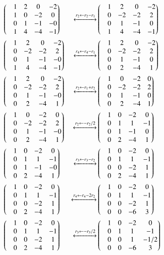 \documentclass[journal,12pt,twocolumn]{IEEEtran}
\begin{document}
\begin{align}
 & \begin{pmatrix}&1 &2 & 0 &-2 \\ &1 &0 &-2 & 0 \\ &0 &1 &-1 &-0 \\&1 &4 &-4 &-1\end{pmatrix} &\xleftrightarrow[]{r_2 \leftarrow r_2 - r_1} &\begin{pmatrix}&1 &2 &0 &-2 \\ &0 &-2 &-2 &2 \\ &0 &1 &-1 &0 \\&1 &4 &-4 &-1\end{pmatrix} \\
 & \begin{pmatrix}&1 &2 &0 &-2 \\ &0 &-2 &-2 &2 \\ &0 &1 &-1 &-0 \\&1 &4 &-4 &-1\end{pmatrix} &\xleftrightarrow[]{r_4 \leftarrow r_4 - r_1}&\begin{pmatrix}&1 &2 &0 &-2 \\ &0 &-2 &-2 &2 \\ &0 &1 &-1 &0 \\&0 &2 &-4 &1\end{pmatrix} \\
 & \begin{pmatrix}&1 &2 &0 &-2 \\ &0 &-2 &-2 &2 \\ &0 &1 &-1 &-0 \\&0 &2 &-4 &1\end{pmatrix} &\xleftrightarrow[]{r_2 \leftarrow r_1 + r_2} &\begin{pmatrix}&1 &0 &-2 &0 \\ &0 &-2 &-2 &2 \\ &0 &1 &-1 &0 \\&0 &2 &-4 &1\end{pmatrix} \\
 & \begin{pmatrix}&1 &0 &-2 &0 \\ &0 &-2 &-2 &2 \\ &0 &1 &-1 &-0 \\&0 &2 &-4 &1\end{pmatrix} &\xleftrightarrow[]{r_2 \leftarrow -r_2/2 } &\begin{pmatrix}&1 &0 &-2 &0 \\ &0 &1 &1 &-1 \\ &0 &1 &-1 &0 \\&0 &2 &-4 &1\end{pmatrix} \\
 & \begin{pmatrix}&1 &0 &-2 &0 \\ &0 &1 &1 &-1 \\ &0 &1 &-1 &-0 \\&0 &2 &-4 &1\end{pmatrix}  &\xleftrightarrow[]{r_3 \leftarrow r_3 - r_2 } &\begin{pmatrix}&1 &0 &-2 &0 \\ &0 &1 &1 &-1 \\ &0 &0 &-2 &1 \\&0 &2 &-4 &1\end{pmatrix}\\
 &\begin{pmatrix}&1 &0 &-2 &0 \\ &0 &1 &1 &-1 \\ &0 &0 &-2 &1 \\&0 &2 &-4 &1\end{pmatrix} 
 &\xleftrightarrow[]{r_4 \leftarrow r_4 - 2r_2 } &\begin{pmatrix}&1 &0 &-2 &0 \\ &0 &1 &1 &-1 \\ &0 &0 &-2 &1 \\&0 &0 &-6 &3\end{pmatrix} \\
 &\begin{pmatrix}&1 &0 &-2 &0 \\ &0 &1 &1 &-1 \\ &0 &0 &-2 &1 \\&0 &2 &-4 &1\end{pmatrix} 
 &\xleftrightarrow[]{r_3 \leftarrow -r_3/2 } &\begin{pmatrix}&1 &0 &-2 &0 \\ &0 &1 &1 &-1 \\ &0 &0 &1 &-1/2 \\&0 &0 &-6 &3\end{pmatrix}
\end{align}
\end{document}
